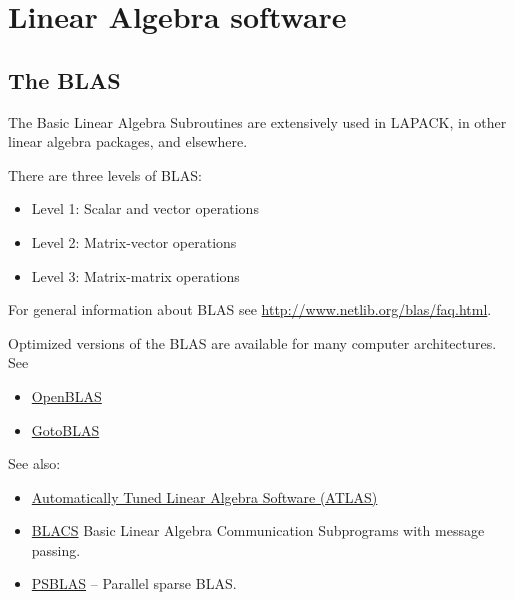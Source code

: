 \documentclass[letterpaper,10pt,english]{sphinxmanual}
\begin{document}
\section{Linear Algebra software}
\label{linalg:linear-algebra-software}\label{linalg::doc}\label{linalg:linalg}

\subsection{The BLAS}
\label{linalg:blas}\label{linalg:the-blas}
The Basic Linear Algebra Subroutines are extensively used in LAPACK, in
other linear algebra packages, and elsewhere.

There are three levels of BLAS:
\begin{itemize}
\item {} 
Level 1: Scalar and vector operations

\item {} 
Level 2: Matrix-vector operations

\item {} 
Level 3: Matrix-matrix operations

\end{itemize}

For general information about BLAS see
\href{http://www.netlib.org/blas/faq.html}{http://www.netlib.org/blas/faq.html}.

Optimized versions of the BLAS are available for many computer
architectures.  See
\begin{itemize}
\item {} 
\href{http://xianyi.github.io/OpenBLAS/}{OpenBLAS}

\item {} 
\href{http://www.tacc.utexas.edu/tacc-projects/gotoblas2}{GotoBLAS}

\end{itemize}

See also:
\begin{itemize}
\item {} 
\href{http://math-atlas.sourceforge.net/}{Automatically Tuned Linear Algebra Software (ATLAS)}

\item {} 
\href{http://www.netlib.org/blacs/}{BLACS} Basic Linear Algebra Communication
Subprograms with message passing.

\item {} 
\href{http://www.ce.uniroma2.it/psblas/}{PSBLAS} -- Parallel sparse BLAS.

\end{itemize}
\end{document}
